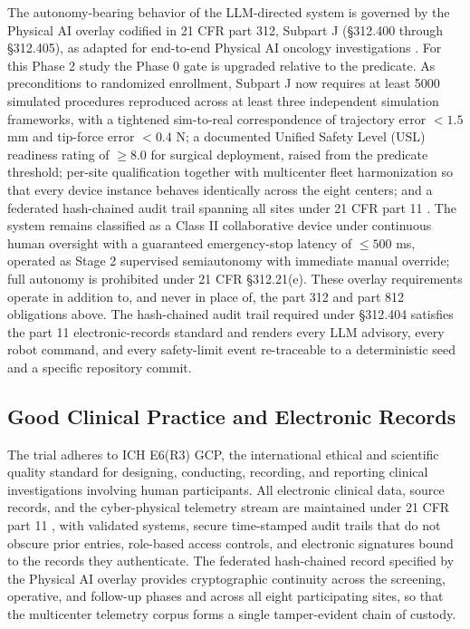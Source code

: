 The autonomy-bearing behavior of the LLM-directed system is governed by the
Physical AI overlay codified in 21 CFR part 312, Subpart J (\S312.400 through
\S312.405), as adapted for end-to-end Physical AI oncology investigations
\cite{kawchak2026adapt312}. For this Phase 2 study the Phase 0 gate is upgraded
relative to the predicate. As preconditions to randomized enrollment, Subpart J
now requires at least 5000 simulated procedures reproduced across at least three
independent simulation frameworks, with a tightened sim-to-real correspondence of
trajectory error $< 1.5$ mm and tip-force error $< 0.4$ N; a documented Unified
Safety Level (USL) readiness rating of $\geq 8.0$ for surgical deployment, raised
from the predicate threshold; per-site qualification together with multicenter
fleet harmonization so that every device instance behaves identically across the
eight centers; and a federated hash-chained audit trail spanning all sites under
21 CFR part 11 \cite{ecfr2026part11}. The system remains classified as a Class II
collaborative device under continuous human oversight with a guaranteed
emergency-stop latency of $\leq 500$ ms, operated as Stage 2 supervised
semiautonomy with immediate manual override; full autonomy is prohibited under 21
CFR \S312.21(e). These overlay requirements operate in addition to, and never in
place of, the part 312 and part 812 obligations above. The hash-chained audit
trail required under \S312.404 satisfies the part 11 electronic-records standard
and renders every LLM advisory, every robot command, and every safety-limit event
re-traceable to a deterministic seed and a specific repository commit.

\subsection{Good Clinical Practice and Electronic Records}

The trial adheres to ICH E6(R3) GCP, the international ethical and scientific
quality standard for designing, conducting, recording, and reporting clinical
investigations involving human participants. All electronic clinical data,
source records, and the cyber-physical telemetry stream are maintained under 21
CFR part 11 \cite{ecfr2026part11}, with validated systems, secure time-stamped
audit trails that do not obscure prior entries, role-based access controls, and
electronic signatures bound to the records they authenticate. The federated
hash-chained record specified by the Physical AI overlay provides cryptographic
continuity across the screening, operative, and follow-up phases and across all
eight participating sites, so that the multicenter telemetry corpus forms a single
tamper-evident chain of custody.

